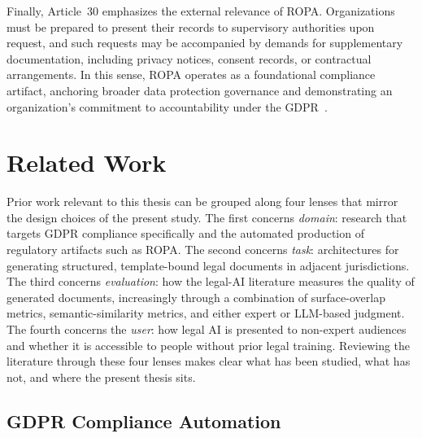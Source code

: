 Finally, Article~30 emphasizes the external relevance of ROPA. Organizations must be prepared to present their records to supervisory authorities upon request, and such requests may be accompanied by demands for supplementary documentation, including privacy notices, consent records, or contractual arrangements. In this sense, ROPA operates as a foundational compliance artifact, anchoring broader data protection governance and demonstrating an organization's commitment to accountability under the GDPR~\cite{gdpr-info-art30, osano-ropa}.



\section{Related Work}

Prior work relevant to this thesis can be grouped along four lenses that mirror the design choices of the present study. The first concerns \emph{domain}: research that targets GDPR compliance specifically and the automated production of regulatory artifacts such as ROPA. The second concerns \emph{task}: architectures for generating structured, template-bound legal documents in adjacent jurisdictions. The third concerns \emph{evaluation}: how the legal-AI literature measures the quality of generated documents, increasingly through a combination of surface-overlap metrics, semantic-similarity metrics, and either expert or LLM-based judgment. The fourth concerns the \emph{user}: how legal AI is presented to non-expert audiences and whether it is accessible to people without prior legal training. Reviewing the literature through these four lenses makes clear what has been studied, what has not, and where the present thesis sits.

\subsection{GDPR Compliance Automation}

